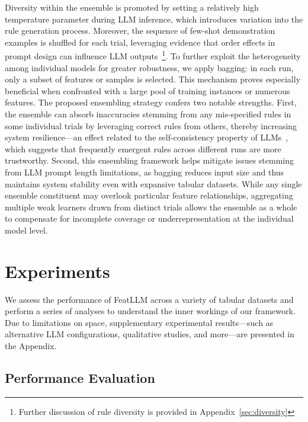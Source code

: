 Diversity within the ensemble is promoted by setting a relatively high temperature parameter during LLM inference, which introduces variation into the rule generation process. Moreover, the sequence of few-shot demonstration examples is shuffled for each trial, leveraging evidence that order effects in prompt design can influence LLM outputs~\cite{lu2022fantastically}\footnote{Further discussion of rule diversity is provided in Appendix~\ref{sec:diversity}}. To further exploit the heterogeneity among individual models for greater robustness, we apply bagging: in each run, only a subset of features or samples is selected. This mechanism proves especially beneficial when confronted with a large pool of training instances or numerous features. The proposed ensembling strategy confers two notable strengths. First, the ensemble can absorb inaccuracies stemming from any mis-specified rules in some individual trials by leveraging correct rules from others, thereby increasing system resilience—an effect related to the self-consistency property of LLMs~\cite{wang2022self}, which suggests that frequently emergent rules across different runs are more trustworthy. Second, this ensembling framework helps mitigate issues stemming from LLM prompt length limitations, as bagging reduces input size and thus maintains system stability even with expansive tabular datasets. While any single ensemble constituent may overlook particular feature relationships, aggregating multiple weak learners drawn from distinct trials allows the ensemble as a whole to compensate for incomplete coverage or underrepresentation at the individual model level.

\section{Experiments}
We assess the performance of \textsf{FeatLLM} across a variety of tabular datasets and perform a series of analyses to understand the inner workings of our framework. Due to limitations on space, supplementary experimental results—such as alternative LLM configurations, qualitative studies, and more—are presented in the Appendix.

\subsection{Performance Evaluation}

